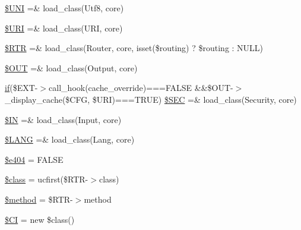 \begin{DoxyCompactItemize}
\item 
\hyperlink{_admin_2system_2core_2_code_igniter_8php_a2060dabd8d00b5b0539bd041bf450924}{\$\+U\+N\+I} =\& load\+\_\+class(\textquotesingle{}Utf8\textquotesingle{}, \textquotesingle{}core\textquotesingle{})
\item 
\hyperlink{_admin_2system_2core_2_code_igniter_8php_a630d83d898b39ad4568906284f7f5336}{\$\+U\+R\+I} =\& load\+\_\+class(\textquotesingle{}U\+R\+I\textquotesingle{}, \textquotesingle{}core\textquotesingle{})
\item 
\hyperlink{_admin_2system_2core_2_code_igniter_8php_a4d6c9285c8483e4708a57a4128fc95f3}{\$\+R\+T\+R} =\& load\+\_\+class(\textquotesingle{}Router\textquotesingle{}, \textquotesingle{}core\textquotesingle{}, isset(\$routing) ? \$routing \+: N\+U\+L\+L)
\item 
\hyperlink{_admin_2system_2core_2_code_igniter_8php_ad437402616c81c82c746f09854b23729}{\$\+O\+U\+T} =\& load\+\_\+class(\textquotesingle{}Output\textquotesingle{}, \textquotesingle{}core\textquotesingle{})
\item 
\hyperlink{_admin_2assets_2js_2bootstrap_8min_8js_a87cf461060832b8b68a7b48d9e371e4f}{if}(\$E\+X\+T-\/$>$call\+\_\+hook(\textquotesingle{}cache\+\_\+override\textquotesingle{})===F\+A\+L\+S\+E \&\&\$O\+U\+T-\/$>$\+\_\+display\+\_\+cache(\$C\+F\+G, \$U\+R\+I)===T\+R\+U\+E) \hyperlink{_admin_2system_2core_2_code_igniter_8php_af78ce53fb82103e1165678dd2d3385a4}{\$\+S\+E\+C} =\& load\+\_\+class(\textquotesingle{}Security\textquotesingle{}, \textquotesingle{}core\textquotesingle{})
\item 
\hyperlink{_admin_2system_2core_2_code_igniter_8php_a66d076d48aff75a01bb726f5bdd94d46}{\$\+I\+N} =\& load\+\_\+class(\textquotesingle{}Input\textquotesingle{}, \textquotesingle{}core\textquotesingle{})
\item 
\hyperlink{_admin_2system_2core_2_code_igniter_8php_afab4eb732acc05cebf41e0afce18681c}{\$\+L\+A\+N\+G} =\& load\+\_\+class(\textquotesingle{}Lang\textquotesingle{}, \textquotesingle{}core\textquotesingle{})
\item 
\hyperlink{_admin_2system_2core_2_code_igniter_8php_a20b89fa011927fc498a4a665fa44d061}{\$e404} = F\+A\+L\+S\+E
\item 
\hyperlink{_admin_2system_2core_2_code_igniter_8php_a252ba022809910ea710a068fc1bab657}{\$class} = ucfirst(\$R\+T\+R-\/$>$class)
\item 
\hyperlink{_admin_2system_2core_2_code_igniter_8php_a12661b2fc0f57f97e30a1620889ce9c6}{\$method} = \$R\+T\+R-\/$>$method
\item 
\hyperlink{_admin_2system_2core_2_code_igniter_8php_ae0314d046ddf7fcfaec03222977427d3}{\$\+C\+I} = new \$class()
\end{DoxyCompactItemize}


